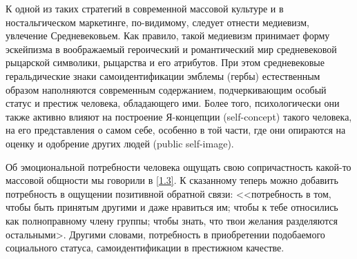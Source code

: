 К одной из таких стратегий в современной массовой культуре и  в ностальгическом маркетинге,
по-видимому, следует отнести  медиевизм, увлечение
Средневековьем\autocites{eco1986dreaming}{eco1986living}{lindstrom2011brandwashed}.
Как правило, такой медиевизм принимает форму эскейпизма в воображаемый
героический и романтический мир средневековой рыцарской символики, рыцарства и
его атрибутов. При этом средневековые геральдические знаки самоидентификации эмблемы
(гербы) естественным образом наполняются современным содержанием,
подчеркивающим особый статус и престиж человека, обладающего
ими\autocites{elistratov2004}{bergelson2002}.
Более того, психологически они также активно влияют на построение Я-концепции
(self-concept) такого человека, на его представления о самом себе, особенно
в той части, где они опираются на оценку и одобрение других людей (public self-image)\autocite{mesheryakov2004}.

Об эмоциональной потребности человека ощущать свою сопричастность какой-то массовой
общности мы говорили в \ref{1.3}. К сказанному теперь можно добавить потребность в ощущении позитивной
обратной связи: <<потребность в том, чтобы быть принятым другими и даже нравиться им; чтобы к тебе  относились как полноправному члену группы; чтобы знать, что твои желания разделяются остальными>\autocite{yule1996pragmatics}. Другими словами, потребность в приобретении
подобаемого социального статуса, самоидентификации в престижном качестве.

